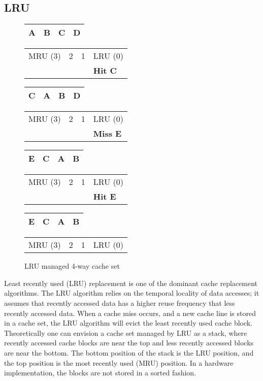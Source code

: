 
\subsection{LRU}
\label{sec:background:algorithms:lru}


\begin{figure}[ht]
	\centering
	\begin{tabular}{|p{2cm}|p{2cm}|p{2cm}|p{2cm}|}
		\hline
		A & B & C & D \\
		\hline
	\end{tabular}
	\begin{tabular}{p{2cm}p{2cm}p{2cm}p{2cm}}
		MRU (3) & 2 & 1 & LRU (0) \\
		    &  &  & \bf{Hit C}
	\end{tabular}	

	\begin{tabular}{|p{2cm}|p{2cm}|p{2cm}|p{2cm}|}
		\hline
		C & A & B & D \\
		\hline
	\end{tabular}
	\begin{tabular}{p{2cm}p{2cm}p{2cm}p{2cm}}
		MRU (3) & 2 & 1 & LRU (0) \\
		    &  &  & \bf{Miss E}
	\end{tabular}	

	\begin{tabular}{|p{2cm}|p{2cm}|p{2cm}|p{2cm}|}
		\hline
		E & C & A & B \\
		\hline
	\end{tabular}
	\begin{tabular}{p{2cm}p{2cm}p{2cm}p{2cm}}
		MRU (3) & 2 & 1 & LRU (0) \\
		    &  &  & \bf{Hit E}
	\end{tabular}	

	\begin{tabular}{|p{2cm}|p{2cm}|p{2cm}|p{2cm}|}
		\hline
		E & C & A & B \\
		\hline
	\end{tabular}
	\begin{tabular}{p{2cm}p{2cm}p{2cm}p{2cm}}
		MRU (3) & 2 & 1 & LRU (0) \\
	\end{tabular}	

	\caption{LRU managed 4-way cache set}
	\label{fig:background:lru_example}
\end{figure}

Least recently used (LRU) replacement is one of the dominant cache replacement algorithms. 
The LRU algorithm relies on the temporal locality of data accesses; it assumes that recently accessed data has a higher reuse frequency that less recently accessed data.
When a cache miss occurs, and a new cache line is stored in a cache set, the LRU algorithm will evict the least recently used cache block.
Theoretically one can envision a cache set managed by LRU as a stack, where recently accessed cache blocks are near the top and less recently accessed blocks are near the bottom.
The bottom position of the stack is the LRU position, and the top position is the most recently used (MRU) position. 
In a hardware implementation, the blocks are not stored in a sorted fashion.

